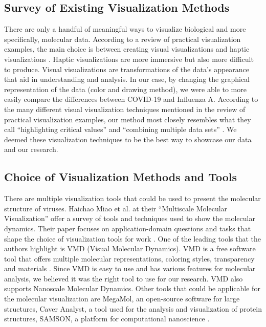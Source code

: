 \documentclass[conference]{IEEEtran}
\begin{document}
\subsection{Survey of Existing Visualization Methods}
There are only a handful of meaningful ways to visualize biological and more specifically, molecular data. According to a review of practical visualization examples, the main choice is between creating visual visualizations and haptic visualizations \citep{Taylor}. Haptic visualizations are more immersive but also more difficult to produce. Visual visualizations are transformations of the data’s appearance that aid in understanding and analysis. In our case, by changing the graphical representation of the data (color and drawing method), we were able to more easily compare the differences between COVID-19 and Influenza A. According to the many different visual visualization techniques mentioned in the review of practical visualization examples, our method most closely resembles what they call “highlighting critical values” and “combining multiple data sets” \citep{Taylor}. We deemed these visualization techniques to be the best way to showcase our data and our research.  

\subsection{Choice of Visualization Methods and Tools}
There are multiple visualization tools that could be used to present the molecular structure of viruses. Haichao Miao et al.  at their “Multiscale Molecular Visualization” offer a survey of tools and techniques used to show the molecular dynamics. Their paper focuses on application-domain questions and tasks that shape the choice of visualization tools for work \citep{Haichao}.  One of the leading tools that the authors highlight is VMD (Visual Molecular Dynamics). VMD is a free software tool that offers multiple molecular representations, coloring styles, transparency and materials \citep{Haichao}.  Since VMD is easy to use and has various features for molecular analysis, we believed it was the right tool to use for our research. VMD also supports Nanoscale Molecular Dynamics. Other tools that could be applicable for the molecular visualization are MegaMol, an open-source software for large structures, Caver Analyst, a tool used for the analysis and visualization of protein structures, SAMSON, a platform for computational nanoscience \citep{Haichao}. 
\end{document}
